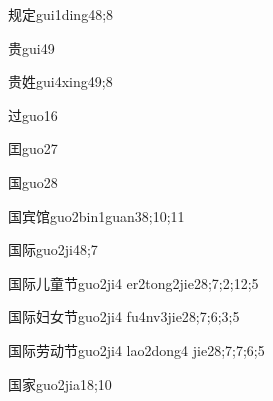 \begin{verbete}{规定}{gui1ding4}{8;8}
\end{verbete}

\begin{verbete}{贵}{gui4}{9}
\end{verbete}

\begin{verbete}{贵姓}{gui4xing4}{9;8}
\end{verbete}

\begin{verbete}{过}{guo1}{6}
\end{verbete}

\begin{verbete}{囯}{guo2}{7}
\end{verbete}

\begin{verbete}{国}{guo2}{8}
\end{verbete}

\begin{verbete}{国宾馆}{guo2bin1guan3}{8;10;11}
\end{verbete}

\begin{verbete}{国际}{guo2ji4}{8;7}
\end{verbete}

\begin{verbete}{国际儿童节}{guo2ji4 er2tong2jie2}{8;7;2;12;5}
\end{verbete}

\begin{verbete}{国际妇女节}{guo2ji4 fu4nv3jie2}{8;7;6;3;5}
\end{verbete}

\begin{verbete}{国际劳动节}{guo2ji4 lao2dong4 jie2}{8;7;7;6;5}
\end{verbete}

\begin{verbete}{国家}{guo2jia1}{8;10}
\end{verbete}

